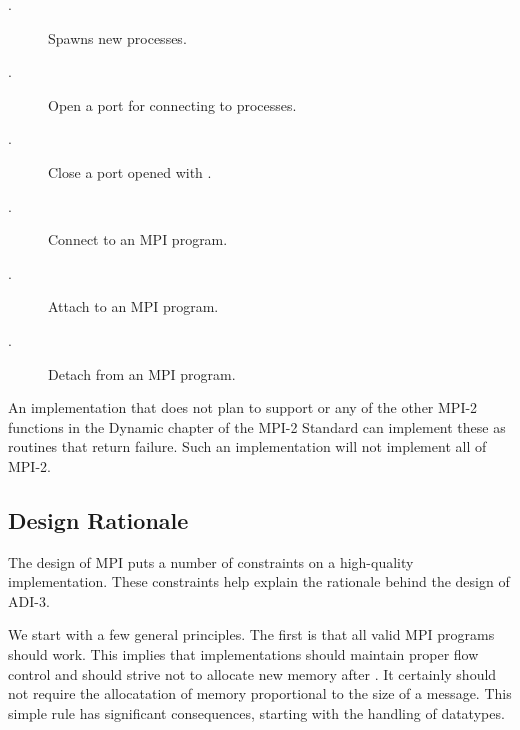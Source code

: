 \documentclass{article}
\begin{document}
\begin{description}
\item[.] Spawns new processes.
\item[.] Open a port for connecting to processes. 
\item[.] Close a port opened with .
\item[.] Connect to an MPI program.
\item[.] Attach to an MPI program.
\item[.] Detach from an MPI program.
\end{description}
An implementation that does not plan to support  or
any of the other MPI-2 functions in the Dynamic chapter of the MPI-2 Standard
can implement these as routines that return failure.  Such an implementation
will not implement all of MPI-2. 

\subsection{Design Rationale}
\label{sec-intermediate}
\label{sec-rationale}
The design of MPI puts a number of constraints on a high-quality
implementation.  These constraints help explain the rationale behind
the design of ADI-3.

We start with a few general principles.  The first is that all valid
MPI programs should work.  This implies that implementations should
maintain proper flow control and should strive not to allocate new
memory after .  It certainly should not require
the allocatation of memory proportional to the size of a message.
This simple rule has significant consequences, starting with the
handling of datatypes.
\end{document}
